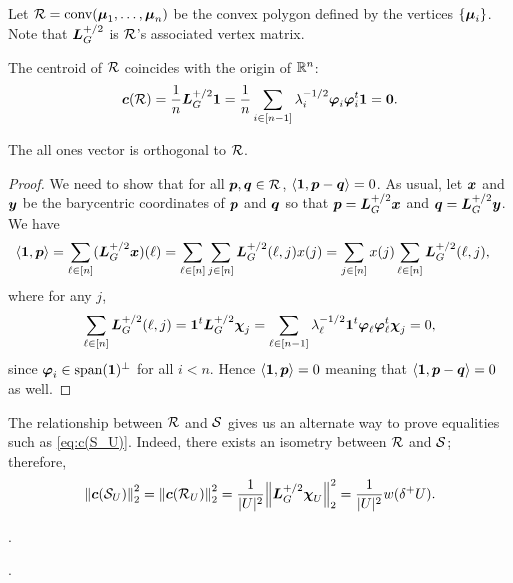 
Let $\mathcal{R}=\textnormal{conv}(\vb*{\mu}_1,\dots,\vb*{\mu}_n)$ be the convex polygon defined by the vertices $\{\vb*{\mu}_i\}$.  Note that $\vb*{L}_G^{+/2}$ is $\mathcal{R}$'s associated vertex matrix. 

The centroid of $\mathcal{R}$ coincides with the origin  of $\mathbb{R}^n$: 
\begin{equation*}
    \vb*{c}(\mathcal{R}) = \frac{1}{n}\vb*{L}_G^{+/2}\vb{1} = \frac{1}{n}\sum_{i\in[n-1]}\lambda_i^{-1/2}\vb*{\varphi}_i\vb*{\varphi}_i^t \vb{1} = \vb{0}.
\end{equation*}

\begin{lemma}
The all ones vector is orthogonal to $\mathcal{R}$. 
\end{lemma}
\begin{proof}
We need to show that for all $\vb*{p},\vb*{q}\in\mathcal{R}$, $\langle \vb{1},\vb*{p}-\vb*{q}\rangle=0$. As usual, let $\vb*{x}$ and $\vb*{y}$ be the barycentric coordinates of $\vb*{p}$ and $\vb*{q}$ so that $\vb*{p}=\vb*{L}_G^{+/2}\vb*{x}$ and $\vb*{q}=\vb*{L}_G^{+/2}\vb*{y}$. We have
\begin{align*}
    \langle \vb{1},\vb*{p}\rangle &= \sum_{\ell\in[n]} (\vb*{L}_G^{+/2}\vb*{x})(\ell) = \sum_{\ell\in[n]} \sum_{j\in [n]}\vb*{L}_G^{+/2}(\ell,j)x(j) = \sum_{j\in[n]}x(j) \sum_{\ell\in[n]}\vb*{L}_G^{+/2}(\ell,j),
\end{align*}
where for any $j$, 
\[\sum_{\ell\in[n]}\vb*{L}_G^{+/2}(\ell,j)= \vb{1}^t \vb*{L}_G^{+/2}\boldsymbol{\chi}_j=\sum_{\ell\in[n-1]} \lambda_\ell^{-1/2}\vb{1}^t \vb*{\varphi}_\ell\vb*{\varphi}_\ell^t\boldsymbol{\chi}_j=0,\]
since $\vb*{\varphi}_i\in\textnormal{span}(\vb{1})^\perp$  for all $i<n$. Hence  $\langle \vb{1},\vb*{p}\rangle=0$ meaning that $\langle \vb{1},\vb*{p}-\vb*{q}\rangle=0$ as well. 
\end{proof}

The relationship between $\mathcal{R}$ and $\mathcal{S}$ gives us an alternate way to prove equalities such as \eqref{eq:c(S_U)}. Indeed, there exists an isometry between $\mathcal{R}$ and $\mathcal{S}$; therefore, 
\begin{equation*}
    \norm{\vb*{c}(\mathcal{S}_U)}_2^2 = \norm{\vb*{c}(\mathcal{R}_U)}_2^2 = \frac{1}{|U|^2} \norm{\vb*{L}_G^{+/2}\boldsymbol{\chi}_U}_2^2 = \frac{1}{|U|^2}w(\delta^+ U).
\end{equation*}


. 

. 

